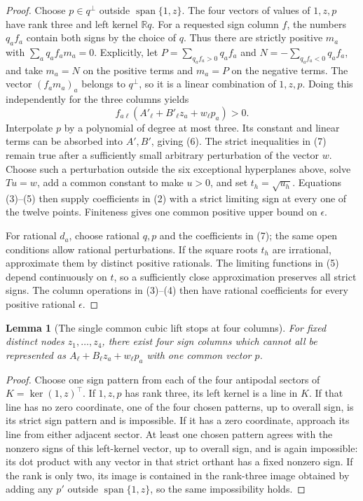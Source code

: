 \documentclass[11pt]{article}
\newtheorem{lemma}[theorem]{Lemma}
\begin{document}
\begin{proof}
Choose $p\in q^\perp$ outside $\operatorname{span}\{1,z\}$.
The four vectors of values of $1,z,p$ have rank three and left
kernel $\mathbb Rq$. For a requested sign column $f$, the numbers
$q_af_a$ contain both signs by the choice of $q$. Thus there are
strictly positive $m_a$ with $\sum_aq_af_am_a=0$. Explicitly, let
$P=\sum_{q_af_a>0}q_af_a$ and $N=-\sum_{q_af_a<0}q_af_a$, and take
$m_a=N$ on the positive terms and $m_a=P$ on the negative terms.
The vector $(f_am_a)_a$ belongs to $q^\perp$, so it is a linear
combination of $1,z,p$. Doing this independently for the three
columns yields
\[
 f_{a\ell}(A'_\ell+B'_\ell z_a+w_\ell p_a)>0.
 \tag{7}
\]
Interpolate $p$ by a polynomial of degree at most three. Its constant
and linear terms can be absorbed into $A',B'$, giving (6).
The strict inequalities in (7) remain true after a sufficiently
small arbitrary perturbation of the vector $w$. Choose such a
perturbation outside the six exceptional hyperplanes above, solve
$Tu=w$, add a common constant to make $u>0$, and set $t_h=\sqrt{u_h}$.
Equations (3)--(5) then supply coefficients in (2) with a strict
limiting sign at every one of the twelve points. Finiteness gives
one common positive upper bound on $\epsilon$.

For rational $d_a$, choose rational $q,p$ and the coefficients in
(7); the same open conditions allow rational perturbations. If the
square roots $t_h$ are irrational, approximate them by distinct
positive rationals. The limiting functions in (5) depend continuously
on $t$, so a sufficiently close approximation preserves all strict
signs. The column operations in (3)--(4) then have rational
coefficients for every positive rational $\epsilon$.
\end{proof}

\begin{lemma}[The single common cubic lift stops at four columns]
For fixed distinct nodes $z_1,\ldots,z_4$, there exist four sign
columns which cannot all be represented as $A_\ell+B_\ell z_a+w_\ell p_a$
with one common vector $p$.
\end{lemma}
\begin{proof}
Choose one sign pattern from each of the four antipodal sectors of
$K=\ker(1,z)^\top$. If $1,z,p$ has rank three, its left kernel is a
line in $K$. If that line has no zero coordinate, one of the four
chosen patterns, up to overall sign, is its strict sign pattern and
is impossible. If it has a zero coordinate, approach its line from
either adjacent sector. At least one chosen pattern agrees with the
nonzero signs of this left-kernel vector, up to overall sign, and
is again impossible: its dot product with any vector in that strict
orthant has a fixed nonzero sign. If the rank is only two, its image
is contained in the rank-three image obtained by adding any $p'$
outside $\operatorname{span}\{1,z\}$, so the same impossibility holds.
\end{proof}
\end{document}
